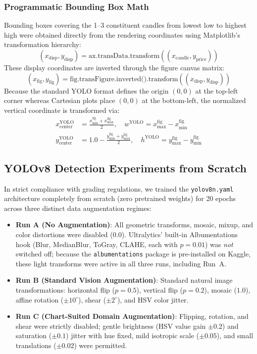 \documentclass[10pt,journal]{IEEEtran}
\begin{document}
\subsubsection{Programmatic Bounding Box Math}
Bounding boxes covering the 1--3 constituent candles from lowest low to highest high were obtained directly from the rendering coordinates using Matplotlib's transformation hierarchy:
\begin{equation}
(x_{\text{disp}}, y_{\text{disp}}) = \text{ax.transData.transform}((x_{\text{candle}}, y_{\text{price}}))
\end{equation}
These display coordinates are inverted through the figure canvas matrix:
\begin{equation}
(x_{\text{fig}}, y_{\text{fig}}) = \text{fig.transFigure.inverted().transform}((x_{\text{disp}}, y_{\text{disp}}))
\end{equation}
Because the standard YOLO format defines the origin $(0,0)$ at the top-left corner whereas Cartesian plots place $(0,0)$ at the bottom-left, the normalized vertical coordinate is transformed via:
\begin{align}
x_{\text{center}}^{\text{YOLO}} &= \frac{x_{\text{min}}^{\text{fig}} + x_{\text{max}}^{\text{fig}}}{2}, \quad w^{\text{YOLO}} = x_{\text{max}}^{\text{fig}} - x_{\text{min}}^{\text{fig}} \\
y_{\text{center}}^{\text{YOLO}} &= 1.0 - \frac{y_{\text{min}}^{\text{fig}} + y_{\text{max}}^{\text{fig}}}{2}, \quad h^{\text{YOLO}} = y_{\text{max}}^{\text{fig}} - y_{\text{min}}^{\text{fig}}
\end{align}

\subsection{YOLOv8 Detection Experiments from Scratch}
In strict compliance with grading regulations, we trained the \texttt{yolov8n.yaml} architecture completely from scratch (zero pretrained weights) for 20 epochs across three distinct data augmentation regimes:
\begin{itemize}
  \item \textbf{Run A (No Augmentation)}: All geometric transforms, mosaic, mixup, and color distortions were disabled ($0.0$). Ultralytics' built-in Albumentations hook (Blur, MedianBlur, ToGray, CLAHE, each with $p=0.01$) was \emph{not} switched off; because the \texttt{albumentations} package is pre-installed on Kaggle, these light transforms were active in all three runs, including Run~A.
  \item \textbf{Run B (Standard Vision Augmentation)}: Standard natural image transformations: horizontal flip ($p=0.5$), vertical flip ($p=0.2$), mosaic ($1.0$), affine rotation ($\pm 10^\circ$), shear ($\pm 2^\circ$), and HSV color jitter.
  \item \textbf{Run C (Chart-Suited Domain Augmentation)}: Flipping, rotation, and shear were strictly disabled; gentle brightness (HSV value gain $\pm 0.2$) and saturation ($\pm 0.1$) jitter with hue fixed, mild isotropic scale ($\pm 0.05$), and small translations ($\pm 0.02$) were permitted.
\end{itemize}
\end{document}
